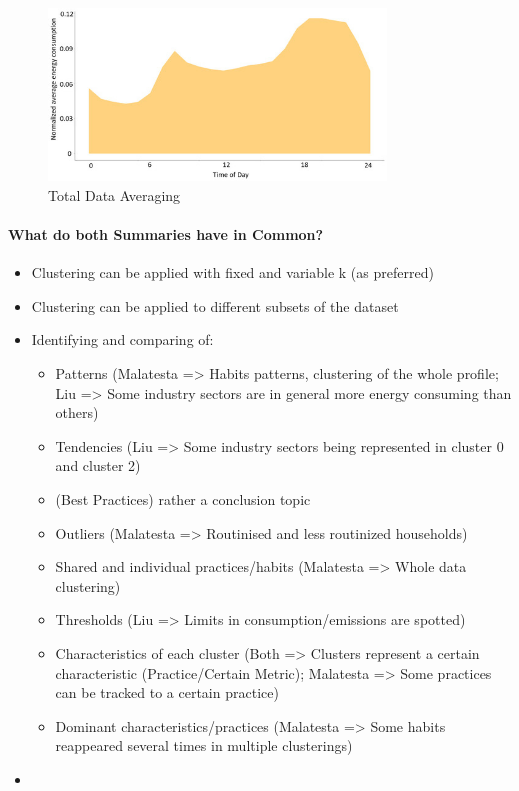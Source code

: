\begin{figure}
    \centering
    \includegraphics[width=0.8\textwidth]{figures/malatesta_hsop/malatesta_totalDataAveraging.jpg}
    \caption{Total Data Averaging \cite{MAL-HBP}}
    \label{fig:total_data_averaging}
\end{figure}

\paragraph*{What do both Summaries have in Common?}
\begin{itemize}
    \item Clustering can be applied with fixed and variable k (as preferred)
    \item Clustering can be applied to different subsets of the dataset
    \item Identifying and comparing of:
    \begin{itemize}
        \item Patterns (Malatesta => Habits patterns, clustering of the whole profile; Liu => Some industry sectors are in general more energy consuming than others)
        \item Tendencies (Liu => Some industry sectors being represented in cluster 0 and cluster 2)
        \item (Best Practices) rather a conclusion topic
        \item Outliers (Malatesta => Routinised and less routinized households)
        \item Shared and individual practices/habits (Malatesta => Whole data clustering)
        \item Thresholds (Liu => Limits in consumption/emissions are spotted)
        \item Characteristics of each cluster (Both => Clusters represent a certain characteristic (Practice/Certain Metric); Malatesta => Some practices can be tracked to a certain practice)
        \item Dominant characteristics/practices (Malatesta => Some habits reappeared several times in multiple clusterings)
    \end{itemize}
    \item
\end{itemize}

